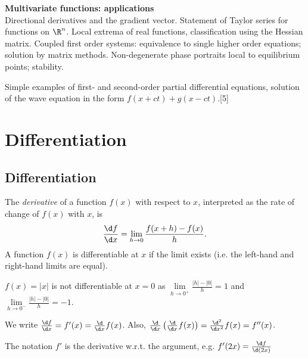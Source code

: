 \documentclass[a4paper]{article}
\begin{document}
{\vspace{10pt}
\noindent\textbf{Multivariate functions: applications}\\
Directional derivatives and the gradient vector. Statement of Taylor series for functions on $\R^n$. Local extrema of real functions, classification using the Hessian matrix. Coupled first order systems: equivalence to single higher order equations; solution by matrix methods. Non-degenerate phase portraits local to equilibrium points; stability.

\vspace{5pt}
\noindent Simple examples of first- and second-order partial differential equations, solution of the wave equation in the form $f(x + ct) + g(x - ct)$.\hspace*{\fill}[5]}
\tableofcontents
\pagebreak
\section{Differentiation}
\subsection{Differentiation}
\begin{defi}
  The \emph{derivative} of a function $f(x)$ with respect to $x$, interpreted as the rate of change of $f(x)$ with $x$, is
  \[
  \frac{\d f}{\d x} = \lim_{h\to 0} \frac{f(x + h) - f(x)}{h}.
  \]
  A function $f(x)$ is differentiable at $x$ if the limit exists (i.e. the left-hand and right-hand limits are equal).
\end{defi}

\begin{eg}
  $f(x)=|x|$ is not differentiable at $x = 0$ as $\lim\limits_{h\to 0^+} \frac{|h| - |0|}{h}= 1$ and $\lim\limits_{h\to 0^-} \frac{|h| - |0|}{h}= -1$.
\end{eg}

\begin{notation}
  We write $\frac{\d f}{\d x} = f'(x) = \frac{\d}{\d x} f(x)$. Also, $\frac{\d}{\d x}\left(\frac{\d}{\d x} f(x)\right) = \frac{\d^2}{\d x^2} f(x) = f''(x)$.

\note The notation $f'$ is the derivative w.r.t. the argument, e.g. $f'(2x) = \frac{\d f}{\d (2x)}$
\end{notation}
\end{document}
